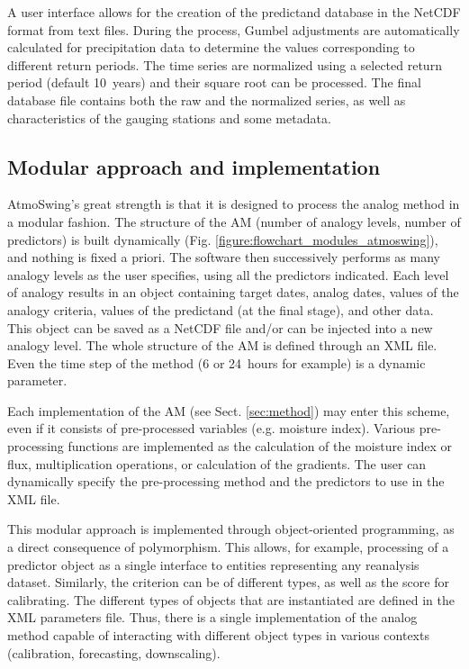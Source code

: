 \documentclass[gmdd]{copernicus}
\begin{document}
A user interface allows for the creation of the predictand database in the NetCDF format from text files. During the process, Gumbel adjustments are automatically calculated for precipitation data to determine the values corresponding to different return periods. The time series are normalized using a selected return period (default 10~years) and their square root can be processed. The final database file contains both the raw and the normalized series, as well as characteristics of the gauging stations and some metadata.


\subsection{Modular approach and implementation}

AtmoSwing's great strength is that it is designed to process the analog method in a modular fashion. The structure of the AM (number of analogy levels, number of predictors) is built dynamically (Fig. \ref{figure:flowchart_modules_atmoswing}), and nothing is fixed a priori. The software then successively performs as many analogy levels as the user specifies, using all the predictors indicated. Each level of analogy results in an object containing target dates, analog dates, values of the analogy criteria, values of the predictand (at the final stage), and other data. This object can be saved as a NetCDF file and/or can be injected into a new analogy level. The whole structure of the AM is defined through an XML file. Even the time step of the method (6 or 24~hours for example) is a dynamic parameter.

Each implementation of the AM (see Sect. \ref{sec:method}) may enter this scheme, even if it consists of pre-processed variables (e.g. moisture index). Various pre-processing functions are implemented as the calculation of the moisture index or flux, multiplication operations, or calculation of the gradients. The user can dynamically specify the pre-processing method and the predictors to use in the XML file.

This modular approach is implemented through object-oriented programming, as a direct consequence of polymorphism. This allows, for example, processing of a predictor object as a single interface to entities representing any reanalysis dataset. Similarly, the criterion can be of different types, as well as the score for calibrating. The different types of objects that are instantiated are defined in the XML parameters file. Thus, there is a single implementation of the analog method capable of interacting with different object types in various contexts (calibration, forecasting, downscaling). 
\end{document}
